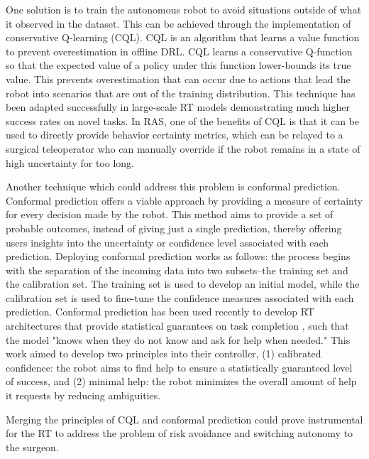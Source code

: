 \documentclass[fleqn,10pt]{wlscirep}\twocolumn
\begin{document}
One solution is to train the autonomous robot to avoid situations outside of what it observed in the dataset. 
This can be achieved through the implementation of conservative Q-learning (CQL)\cite{kumar2020conservative}.
CQL is an algorithm that learns a value function to prevent overestimation in offline DRL. 
CQL learns a conservative Q-function so that the expected value of a policy under this function lower-bounds its true value. 
This prevents overestimation that can occur due to actions that lead the robot into scenarios that are out of the training distribution. 
This technique has been adapted successfully in large-scale RT models\cite{chebotar2023q} demonstrating much higher success rates on novel tasks.
In RAS, one of the benefits of CQL is that it can be used to directly provide behavior certainty metrics, which can be relayed to a surgical teleoperator who can manually override if the robot remains in a state of high uncertainty for too long.

Another technique which could address this problem is conformal prediction\cite{angelopoulos2021gentle}. Conformal prediction offers a viable approach by providing a measure of certainty for every decision made by the robot. This method aims to provide a set of probable outcomes, instead of giving just a single prediction, thereby offering users insights into the uncertainty or confidence level associated with each prediction. Deploying conformal prediction works as follows: the process begins with the separation of the incoming data into two subsets--the training set and the calibration set. The training set is used to develop an initial model, while the calibration set is used to fine-tune the confidence measures associated with each prediction. %
Conformal prediction has been used recently to develop RT architectures that provide statistical guarantees on task completion\cite{ren2023robots} , such that the model "knows when they do not know and ask for help when needed."
This work aimed to develop two principles into their controller, (1) calibrated confidence: the robot aims to find help to ensure a statistically guaranteed level of success, and (2) minimal help: the robot minimizes the overall amount of help it requests by reducing ambiguities. 

Merging the principles of CQL and conformal prediction could prove instrumental for the RT to address the problem of risk avoidance and switching autonomy to the surgeon.
\end{document}
